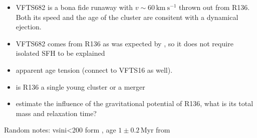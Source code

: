 \documentclass{aa}
\begin{document}
\begin{itemize}
\item VFTS682 is a bona fide runaway with $v\sim60\,\mathrm{km\
    s^{-1}}$ thrown out from R136. Both its speed and the age of the
  cluster are consitent with a dynamical ejection.
  \item VFTS682 comes from R136 as was expected by
  \cite{bestenlehner:11, fujii:11, banerjee:12}, so it does not
  require isolated SFH to be explained
\item apparent age tension (connect to VFTS16 as well).
\item is R136 a single young cluster or a merger
\item estimate the influence of the gravitational potential of R136,
  what is its total mass and relaxation time?
\end{itemize}

Random notes: vsini<200 form \cite{schneider:18}, age $1\pm 0.2$\,Myr
from \cite{schneider:18}




\end{document}
